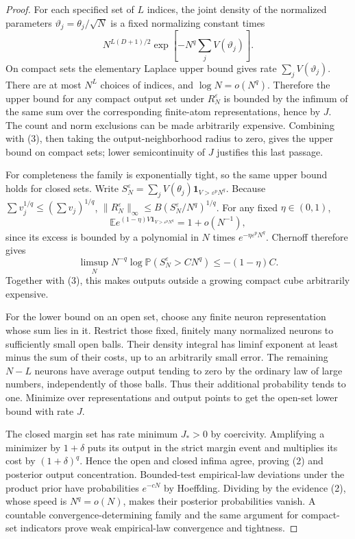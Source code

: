 \documentclass[11pt]{article}
\newcommand{\E}{\mathbb E}\newcommand{\Pp}{\mathbb P}
\newcommand{\one}{\mathbf1}
\begin{document}
\begin{proof}
For each specified set of $L$ indices, the joint density of the
normalized parameters $\vartheta_j=\theta_j/\sqrt N$ is a fixed
normalizing constant times
\[
 N^{L(D+1)/2}\exp[-N^q\textstyle\sum_jV(\vartheta_j)].
\]
On compact sets the elementary Laplace upper bound gives rate
$\sum_jV(\vartheta_j)$. There are at most $N^L$ choices of indices,
and $\log N=o(N^q)$. Therefore the upper bound for any compact output
set under $R_N^\varepsilon$ is bounded by the infimum of the same sum
over the corresponding finite-atom representations, hence by $J$.
The count and norm exclusions can be made arbitrarily expensive.
Combining with (3), then taking the output-neighborhood radius to zero,
gives the upper bound on compact sets; lower semicontinuity of $J$
justifies this last passage.

For completeness the family is exponentially tight, so the same upper
bound holds for closed sets. Write
$S_N^\varepsilon=\sum_jV(\theta_j)\one_{V>\varepsilon^pN^q}$.
Because $\sum v_j^{1/q}\le(\sum v_j)^{1/q}$,
$\|R_N^\varepsilon\|_\infty\le B(S_N^\varepsilon/N^q)^{1/q}$.
For any fixed $\eta\in(0,1)$,
\[
 \E e^{(1-\eta)V\one_{V>\varepsilon^pN^q}}=1+o(N^{-1}),
\]
since its excess is bounded by a polynomial in $N$ times
$e^{-\eta\varepsilon^pN^q}$. Chernoff therefore gives
\[
 \limsup_N N^{-q}\log\Pp(S_N^\varepsilon>C N^q)
                      \le-(1-\eta)C.                    \tag{4}
\]
Together with (3), this makes outputs outside a growing compact cube
arbitrarily expensive.

For the lower bound on an open set, choose any finite neuron
representation whose sum lies in it. Restrict those fixed, finitely
many normalized neurons to sufficiently small open balls. Their density
integral has liminf exponent at least minus the sum of their costs,
up to an arbitrarily small error. The remaining $N-L$ neurons have
average output tending to zero by the ordinary law of large numbers,
independently of those balls. Thus their additional probability tends
to one. Minimize over representations and output points to get the
open-set lower bound with rate $J$.

The closed margin set has rate minimum $J_*>0$ by coercivity.
Amplifying a minimizer by $1+\delta$ puts its output in the strict
margin event and multiplies its cost by $(1+\delta)^q$. Hence the
open and closed infima agree, proving (2) and posterior output
concentration. Bounded-test empirical-law deviations under the product
prior have probabilities $e^{-cN}$ by Hoeffding. Dividing by the
evidence (2), whose speed is $N^q=o(N)$, makes their posterior
probabilities vanish. A countable convergence-determining family and
the same argument for compact-set indicators prove weak empirical-law
convergence and tightness.
\end{proof}
\end{document}
